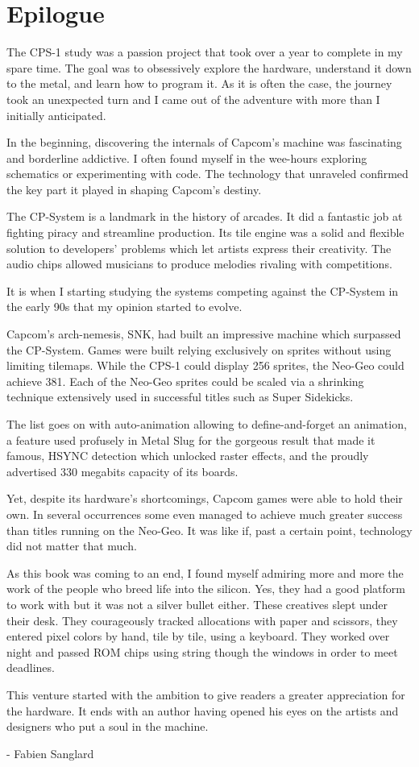 \chapter{Epilogue} 

The CPS-1 study was a passion project that took over a year to complete in my spare time. The goal was to obsessively explore the hardware, understand it down to the metal, and learn how to program it. As it is often the case, the journey took an unexpected turn and I came out of the adventure with more than I initially anticipated.

In the beginning, discovering the internals of Capcom's machine was fascinating and borderline addictive. I often found myself in the wee-hours exploring schematics or experimenting with code. The technology that unraveled confirmed the key part it played in shaping Capcom's destiny. 

The CP-System is a landmark in the history of arcades. It did a fantastic job at fighting piracy and streamline production. Its tile engine was a solid and flexible solution to developers' problems which let artists express their creativity. The audio chips allowed musicians to produce melodies rivaling with competitions.

It is when I starting studying the systems competing against the CP-System in the early 90s that my opinion started to evolve. 

Capcom's arch-nemesis, SNK, had built an impressive machine which surpassed the CP-System. Games were built relying exclusively on sprites without using limiting tilemaps. While the CPS-1 could display 256 sprites, the Neo-Geo could achieve 381. Each of the Neo-Geo sprites could be scaled via a shrinking technique extensively used in successful titles such as Super Sidekicks. 

The list goes on with auto-animation allowing to define-and-forget an animation, a feature used profusely in Metal Slug for the gorgeous result that made it famous, HSYNC detection which unlocked raster effects, and the proudly advertised 330 megabits capacity of its boards.

Yet, despite its hardware's shortcomings, Capcom games were able to hold their own. In several occurrences some even managed to achieve much greater success than titles running on the Neo-Geo. It was like if, past a certain point, technology did not matter that much.

As this book was coming to an end, I found myself admiring more and more the work of the people who breed life into the silicon. Yes, they had a good platform to work with but it was not a silver bullet either. These creatives slept under their desk. They courageously tracked allocations with paper and scissors, they entered pixel colors by hand, tile by tile, using a keyboard. They worked over night and passed ROM chips using string though the windows in order to meet deadlines.

This venture started with the ambition to give readers a greater appreciation for the hardware. It ends with an author having opened his eyes on the artists and designers who put a soul in the machine.

- Fabien Sanglard
